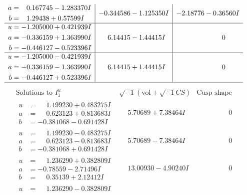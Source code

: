 \documentclass[1p]{elsarticle_modified}
\theoremstyle{definition}
\newcommand{\I}{\sqrt{-1}}
\begin{document}
$$\begin{array}{c|c|c}
\begin{aligned}
a &= \phantom{-}0.167745 - 1.283370 I \\
b &= \phantom{-}1.29438 + 0.57599 I\end{aligned}
 & -0.344586 - 1.125350 I & -2.18776 - 0.36560 I \\ \hline\begin{aligned}
u &= -1.205000 + 0.421939 I \\
a &= -0.336159 + 1.363990 I \\
b &= -0.446127 - 0.523396 I\end{aligned}
 & \phantom{-}6.14415 - 1.44415 I & \phantom{-0.000000 } 0 \\ \hline\begin{aligned}
u &= -1.205000 - 0.421939 I \\
a &= -0.336159 - 1.363990 I \\
b &= -0.446127 + 0.523396 I\end{aligned}
 & \phantom{-}6.14415 + 1.44415 I & \phantom{-0.000000 } 0\\
 \hline 
 \end{array}$$\newpage$$\begin{array}{c|c|c}  
\text{Solutions to }I^u_{1}& \I (\text{vol} + \sqrt{-1}CS) & \text{Cusp shape}\\
 \hline 
\begin{aligned}
u &= \phantom{-}1.199230 + 0.483275 I \\
a &= \phantom{-}0.623123 + 0.813683 I \\
b &= -0.381068 - 0.691428 I\end{aligned}
 & \phantom{-}5.70689 + 7.38464 I & \phantom{-0.000000 } 0 \\ \hline\begin{aligned}
u &= \phantom{-}1.199230 - 0.483275 I \\
a &= \phantom{-}0.623123 - 0.813683 I \\
b &= -0.381068 + 0.691428 I\end{aligned}
 & \phantom{-}5.70689 - 7.38464 I & \phantom{-0.000000 } 0 \\ \hline\begin{aligned}
u &= \phantom{-}1.236290 + 0.382809 I \\
a &= -0.78559 - 2.71496 I \\
b &= \phantom{-}0.35139 + 2.12412 I\end{aligned}
 & \phantom{-}13.00930 - 4.90240 I & \phantom{-0.000000 } 0 \\ \hline\begin{aligned}
u &= \phantom{-}1.236290 - 0.382809 I \\

\end{aligned}
\end{array}$$
\end{document}
